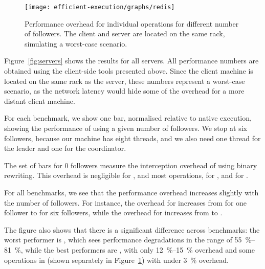 \begin{figure}[!t]
 \centering
 \texttt{[image: efficient-execution/graphs/redis]}
 \caption{Performance overhead for individual \redis operations for different
 number of followers. The client and server are located on the same rack,
 simulating a worst-case scenario.}
 \label{fig:redis-ops}
\end{figure}

Figure~\ref{fig:servers} shows the results for all servers. All
performance numbers are obtained using the client-side tools presented
above.  Since the client machine is located on the same rack as the
server, these numbers represent a worst-case scenario, as the network
latency would hide some of the overhead for a more distant client
machine.


For each benchmark, we show one bar, normalised relative to native
execution, showing the performance of \varan using a given number of
followers.  We stop at six followers, because our machine has eight
threads, and we also need one thread for the leader and one for the
coordinator.  

The set of bars for 0 followers measure the interception overhead
of \varan using binary rewriting.  This overhead is negligible for
\lighttpd, \memcached and most \redis operations, \nginxIntercept for \nginx,
and \beanstalkdIntercept for \beanstalkd.

For all benchmarks, we see that the performance overhead increases
slightly with the number of followers.  For instance, the overhead for
\beanstalkd increases from \beanstalkdOneFollower for one follower to
\beanstalkdSixFollowers for six followers, while the overhead for
\lighttpd increases from \lighttpdOneFollower to
\lighttpdSixFollowers.

The figure also shows that there is a significant difference across
benchmarks: the worst performer is \beanstalkd, which sees performance
degradations in the range of \SIrange{55}{81}{\percent}, while the best performers are
\lighttpd, with only \SIrange{12}{15}{\percent} overhead and some operations in \redis
(shown separately in Figure~\ref{fig:redis-ops})
with under \SI{3}{\percent} overhead.
